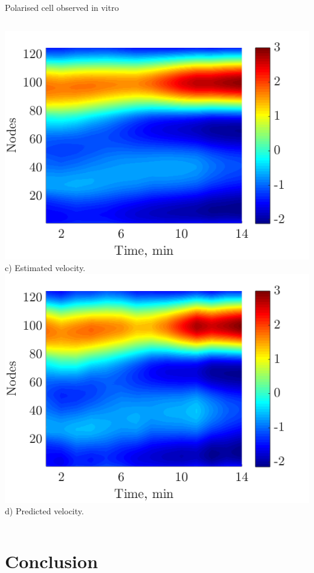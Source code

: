 \documentclass[mathserif,11pt]{beamer}
\begin{document}
\begin{frame}{Polarised cell observed in vitro}
\begin{columns}
\begin{column}{0.35\textwidth}
	\includegraphics[scale=0.3]{Figures/polarised_estimated_velocity.png}\vfil
	\footnotesize{c) Estimated velocity.}
	\vfil
	\includegraphics[scale=0.3]{Figures/polarised_modelled_velocity.png}\vfil
	\footnotesize{d) Predicted velocity.}
\end{column}
\end{columns}
\end{frame}



\section{Conclusion}
\end{document}
